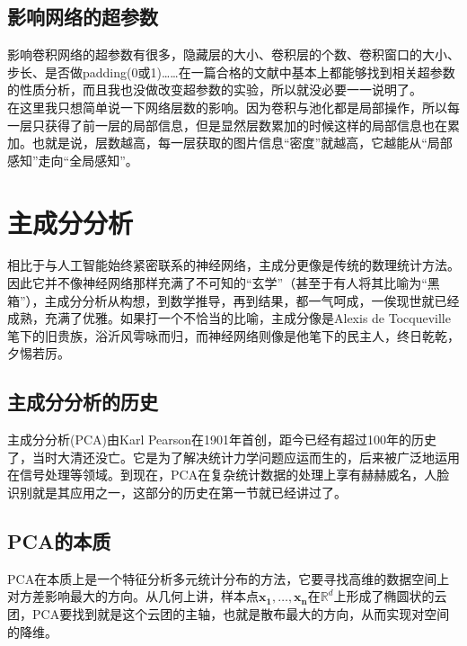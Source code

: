 \documentclass{article}
\begin{document}
\subsection{影响网络的超参数}

影响卷积网络的超参数有很多，隐藏层的大小、卷积层的个数、卷积窗口的大小、步长、是否做padding(0或1)……在一篇合格的文献中基本上都能够找到相关超参数的性质分析，而且我也没做改变超参数的实验，所以就没必要一一说明了。\\

在这里我只想简单说一下网络层数的影响。因为卷积与池化都是局部操作，所以每一层只获得了前一层的局部信息，但是显然层数累加的时候这样的局部信息也在累加。也就是说，层数越高，每一层获取的图片信息“密度”就越高，它越能从“局部感知”走向“全局感知”。


\section{主成分分析}

相比于与人工智能始终紧密联系的神经网络，主成分更像是传统的数理统计方法。因此它并不像神经网络那样充满了不可知的“玄学”（甚至于有人将其比喻为“黑箱”），主成分分析从构想，到数学推导，再到结果，都一气呵成，一俟现世就已经成熟，充满了优雅。如果打一个不恰当的比喻，主成分像是Alexis de Tocqueville笔下的旧贵族，浴沂风雩咏而归，而神经网络则像是他笔下的民主人，终日乾乾，夕惕若厉。

\subsection{主成分分析的历史}

主成分分析(PCA)由Karl Pearson在1901年首创，距今已经有超过100年的历史了，当时大清还没亡。它是为了解决统计力学问题应运而生的，后来被广泛地运用在信号处理等领域。到现在，PCA在复杂统计数据的处理上享有赫赫威名，人脸识别就是其应用之一，这部分的历史在第一节就已经讲过了。

\subsection{PCA的本质}

PCA在本质上是一个特征分析多元统计分布的方法，它要寻找高维的数据空间上对方差影响最大的方向。从几何上讲，样本点$\mathbf{x_1}, \ldots, \mathbf{x_n}$在$\mathbb{R}^d$上形成了椭圆状的云团，PCA要找到就是这个云团的主轴，也就是散布最大的方向，从而实现对空间的降维。\\
\end{document}
